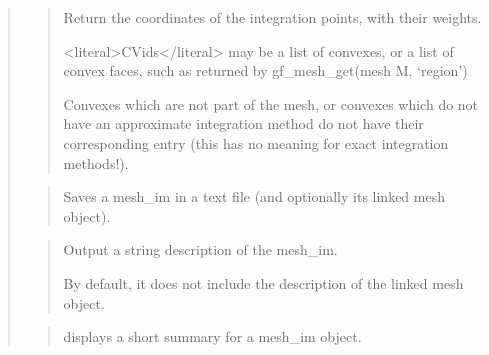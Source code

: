\documentclass[a4paper,11pt,english]{sphinxmanual}
\begin{document}
\begin{quote}
\sphinxAtStartPar
{}
\begin{quote}

\sphinxAtStartPar
Return the coordinates of the integration points, with their weights.

\sphinxAtStartPar
\textless{}literal\textgreater{}CVids\textless{}/literal\textgreater{} may be a list of convexes, or a list of convex faces, such
as returned by gf\_mesh\_get(mesh M, ‘region’)

\sphinxAtStartPar
{}

\sphinxAtStartPar
Convexes which are not part of the mesh, or convexes which
do not have an approximate integration method do not have
their corresponding entry (this has no meaning for exact
integration methods!).
\end{quote}

\sphinxAtStartPar
{}
\begin{quote}

\sphinxAtStartPar
Saves a mesh\_im in a text file (and optionally its linked mesh object).
\end{quote}

\sphinxAtStartPar
{}
\begin{quote}

\sphinxAtStartPar
Output a string description of the mesh\_im.

\sphinxAtStartPar
By default, it does not include the description of the linked
mesh object.
\end{quote}

\sphinxAtStartPar
{}
\begin{quote}

\sphinxAtStartPar
displays a short summary for a mesh\_im object.
\end{quote}

\sphinxAtStartPar
{}
\begin{quote}


\end{quote}
\end{quote}
\end{document}
